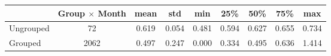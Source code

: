 \begin{tabular}{lcccccccc}
\toprule
{} &  Group $ \times $ Month &   mean &    std &    min &    25\% &    50\% &    75\% &    max \\
\midrule
Ungrouped &                    72 &  0.619 &  0.054 &  0.481 &  0.594 &  0.627 &  0.655 &  0.734 \\
Grouped   &                  2062 &  0.497 &  0.247 &  0.000 &  0.334 &  0.495 &  0.636 &  1.414 \\
\bottomrule
\end{tabular}
